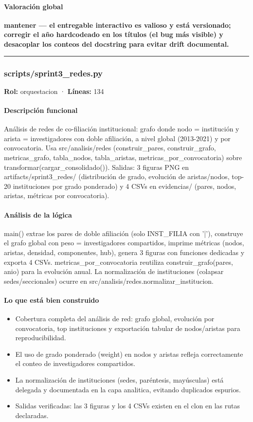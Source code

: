 \paragraph{Valoración global}
\textbf{mantener --- el entregable interactivo es valioso y está versionado; corregir el año hardcodeado en los títulos (el bug más visible) y desacoplar los conteos del docstring para evitar drift documental.}

\medskip
\hrule

\subsubsection{scripts/sprint3\_redes.py}
\textbf{Rol:} orquestacion · \textbf{Líneas:} 134

\paragraph{Descripción funcional}
Análisis de redes de co-filiación institucional: grafo donde nodo = institución y arista = investigadores con doble afiliación, a nivel global (2013-2021) y por convocatoria. Usa src/analisis/redes (construir\_pares, construir\_grafo, metricas\_grafo, tabla\_nodos, tabla\_aristas, metricas\_por\_convocatoria) sobre transformar(cargar\_consolidado()). Salidas: 3 figuras PNG en artifacts/sprint3\_redes/ (distribución de grado, evolución de aristas/nodos, top-20 instituciones por grado ponderado) y 4 CSVs en evidencias/ (pares, nodos, aristas, métricas por convocatoria).

\paragraph{Análisis de la lógica}
main() extrae los pares de doble afiliación (solo INST\_FILIA con '|'), construye el grafo global con peso = investigadores compartidos, imprime métricas (nodos, aristas, densidad, componentes, hub), genera 3 figuras con funciones dedicadas y exporta 4 CSVs. metricas\_por\_convocatoria reutiliza construir\_grafo(pares, anio) para la evolución anual. La normalización de instituciones (colapsar sedes/seccionales) ocurre en src/analisis/redes.normalizar\_institucion.

\paragraph{Lo que está bien construido}
\begin{itemize}
  \item Cobertura completa del análisis de red: grafo global, evolución por convocatoria, top instituciones y exportación tabular de nodos/aristas para reproducibilidad.
  \item El uso de grado ponderado (weight) en nodos y aristas refleja correctamente el conteo de investigadores compartidos.
  \item La normalización de instituciones (sedes, paréntesis, mayúsculas) está delegada y documentada en la capa analitica, evitando duplicados espurios.
  \item Salidas verificadas: las 3 figuras y los 4 CSVs existen en el clon en las rutas declaradas.
\end{itemize}

